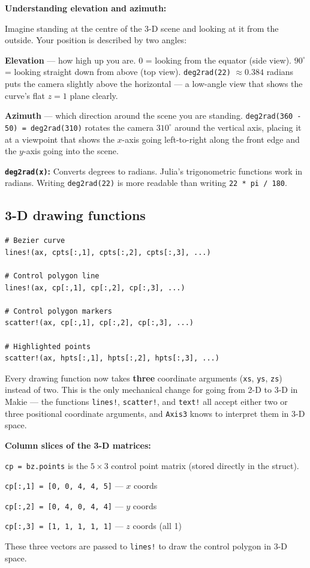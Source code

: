 \documentclass[12pt, a4paper]{article}
\newcommand{\cd}[1]{\texttt{#1}}
\begin{document}
\begin{examplebox}
\textbf{Understanding elevation and azimuth:}

Imagine standing at the centre of the 3-D scene and looking
at it from the outside.
Your position is described by two angles:

\textbf{Elevation} --- how high up you are.
$0$ = looking from the equator (side view).
$90^{\circ}$ = looking straight down from above (top view).
\cd{deg2rad(22)} $\approx 0.384$ radians puts the camera
slightly above the horizontal --- a low-angle view that
shows the curve's flat $z=1$ plane clearly.

\textbf{Azimuth} --- which direction around the scene you
are standing.
\cd{deg2rad(360 - 50) = deg2rad(310)} rotates the camera
$310^{\circ}$ around the vertical axis, placing it at a viewpoint
that shows the $x$-axis going left-to-right along the
front edge and the $y$-axis going into the scene.

\textbf{\cd{deg2rad(x)}:}
Converts degrees to radians.
Julia's trigonometric functions work in radians.
Writing \cd{deg2rad(22)} is more readable than
writing \cd{22 * pi / 180}.
\end{examplebox}

\subsection{3-D drawing functions}

\begin{verbatim}
# Bezier curve
lines!(ax, cpts[:,1], cpts[:,2], cpts[:,3], ...)

# Control polygon line
lines!(ax, cp[:,1], cp[:,2], cp[:,3], ...)

# Control polygon markers
scatter!(ax, cp[:,1], cp[:,2], cp[:,3], ...)

# Highlighted points
scatter!(ax, hpts[:,1], hpts[:,2], hpts[:,3], ...)
\end{verbatim}

Every drawing function now takes \textbf{three} coordinate
arguments (\cd{xs}, \cd{ys}, \cd{zs}) instead of two.
This is the only mechanical change for going from 2-D to
3-D in Makie --- the functions \cd{lines!}, \cd{scatter!},
and \cd{text!} all accept either two or three positional
coordinate arguments, and \cd{Axis3} knows to interpret
them in 3-D space.

\begin{examplebox}
\textbf{Column slices of the 3-D matrices:}

\cd{cp = bz.points} is the $5 \times 3$ control point matrix
(stored directly in the struct).

\cd{cp[:,1] = [0, 0, 4, 4, 5]} \quad --- $x$ coords

\cd{cp[:,2] = [0, 4, 0, 4, 4]} \quad --- $y$ coords

\cd{cp[:,3] = [1, 1, 1, 1, 1]} \quad --- $z$ coords (all 1)

These three vectors are passed to \cd{lines!} to draw the
control polygon in 3-D space.
\end{examplebox}
\end{document}
